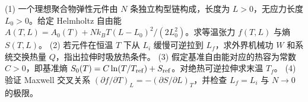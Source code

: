 (1) 一个理想聚合物弹性元件由 \(N\) 条独立构型链构成，长度为 \(L>0\)，无应力长度 \(L_0>0\)。给定 Helmholtz 自由能 \(A(T,L)=A_0(T)+Nk_BT(L-L_0)^2/(2L_0^2)\)。求等温张力 \(f(T,L)\) 与熵 \(S(T,L)\)。
(2) 若元件在恒温 \(T\) 下从 \(L_i\) 缓慢可逆拉到 \(L_f\)，求外界机械功 \(W\) 和系统交换热量 \(Q\)，指出拉伸时吸放热条件。
(3) 假定基准自由能对应的热容为常数 \(C>0\)，即基准熵 \(S_0(T)=C\ln(T/T_{\rm ref})+S_{\rm ref}\)。对绝热可逆拉伸求末温 \(T_f\)。
(4) 验证 Maxwell 交叉关系 \((\partial f/\partial T)_L=-(\partial S/\partial L)_T\)，并检查 \(L_f=L_i\) 与 \(N\to0\) 的极限。
